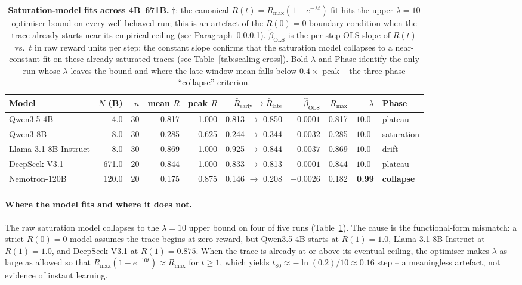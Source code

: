 \documentclass{article}
\providecommand{\tableref}[1]{Table~\ref{#1}}
\providecommand{\paragraphref}[1]{Paragraph~\ref{#1}}
\begin{document}
\begin{table}[t]
  \centering
  \small
  \begin{tabular}{lrrrrrrrrl}
    \toprule
    Model & $N$ (B) & $n$ & mean $R$ & peak $R$ &
           $\bar R_{\text{early}} \!\to\! \bar R_{\text{late}}$ &
           $\hat \beta_{\text{OLS}}$ &
           $R_{\max}$ & $\lambda$ & Phase \\
    \midrule
    Qwen3.5-4B             &   4.0 & 30 & 0.817 & 1.000 & 0.813 $\to$ 0.850 & $+0.0001$ & 0.817 & $10.0^{\dagger}$ & plateau \\
    Qwen3-8B               &   8.0 & 30 & 0.285 & 0.625 & 0.244 $\to$ 0.344 & $+0.0032$ & 0.285 & $10.0^{\dagger}$ & saturation \\
    Llama-3.1-8B-Instruct  &   8.0 & 30 & 0.869 & 1.000 & 0.925 $\to$ 0.844 & $-0.0037$ & 0.869 & $10.0^{\dagger}$ & drift \\
    DeepSeek-V3.1          & 671.0 & 20 & 0.844 & 1.000 & 0.833 $\to$ 0.813 & $+0.0001$ & 0.844 & $10.0^{\dagger}$ & plateau \\
    Nemotron-120B          & 120.0 & 20 & 0.175 & 0.875 & 0.146 $\to$ 0.208 & $+0.0026$ & 0.182 & \textbf{0.99} & \textbf{collapse} \\
    \bottomrule
  \end{tabular}
  \caption{\textbf{Saturation-model fits across 4B--671B.}
    $\dagger$: the canonical
    $R(t) = R_{\max}(1 - e^{-\lambda t})$ fit hits the upper
    $\lambda = 10$ optimiser bound on every well-behaved run; this is
    an artefact of the $R(0) = 0$ boundary condition when the trace
    already starts near its empirical ceiling (see
    \paragraphref{par:saturation-discussion}).
    $\hat \beta_{\text{OLS}}$ is the per-step OLS slope of $R(t)$ vs.~$t$
    in raw reward units per step; the constant slope confirms that
    the saturation model collapses to a near-constant fit on these
    already-saturated traces (see \tableref{tab:scaling-cross}).
    Bold $\lambda$ and Phase identify the only run whose $\lambda$
    leaves the bound and where the late-window mean falls below
    $0.4\times$ peak -- the three-phase ``collapse'' criterion.}
  \label{tab:scaling-fits}
\end{table}

\paragraph{Where the model fits and where it does not.}
\label{par:saturation-discussion}
The raw saturation model collapses to the $\lambda = 10$ upper bound
on four of five runs (Table~\ref{tab:scaling-fits}).  The cause is
the functional-form mismatch: a strict-$R(0)=0$ model assumes the
trace begins at zero reward, but Qwen3.5-4B starts at $R(1)=1.0$,
Llama-3.1-8B-Instruct at $R(1)=1.0$, and DeepSeek-V3.1 at
$R(1)=0.875$.  When the trace is already at or above its eventual
ceiling, the optimiser makes $\lambda$ as large as allowed so that
$R_{\max}(1 - e^{-10 t}) \approx R_{\max}$ for $t \ge 1$, which
yields $t_{80} \approx -\ln(0.2)/10 \approx 0.16$ step -- a
meaningless artefact, not evidence of instant learning.
\end{document}

